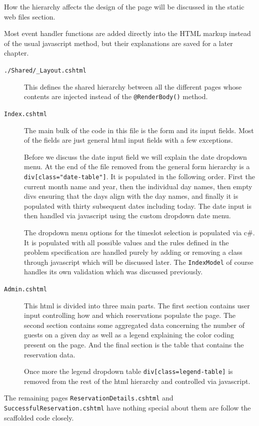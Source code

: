 \documentclass[12pt, a4paper]{article}
\begin{document}
How the hierarchy affects the design of the page will be discussed in the static web files section. 

Most event handler functions are added directly into the HTML markup instead of the usual javascript method, but their explanations are saved for a later chapter.
\begin{description}
    \item[\texttt{./Shared/\_Layout.cshtml}] This defines the shared hierarchy between all the different pages whose contents are injected instead of the \texttt{@RenderBody()} method. 
    \item[\texttt{Index.cshtml}] The main bulk of the code in this file is the form and its input fields. Most of the fields are just general html input fields with a few exceptions.
    
    Before we discuss the date input field we will explain the date dropdown menu.
    At the end of the file removed from the general form hierarchy is a \texttt{div[class="date-table"]}. It is populated in the following order. First the current month name and year, then the individual day names, then empty divs ensuring that the days align with the day names, and finally it is populated with thirty subsequent dates including today.
    The date input is then handled via javascript using the custom dropdown date menu.

    The dropdown menu options for the timeslot selection is populated via c\#. It is populated with all possible values and the rules defined in the problem specification are handled purely by adding or removing a class through javascript which will be discussed later. The \texttt{IndexModel} of course handles its own validation which was discussed previously.
    \item[\texttt{Admin.cshtml}] This html is divided into three main parts. The first section contains user input controlling how and which reservations populate the page. The second section contains some aggregated data concerning the number of guests on a given day as well as a legend explaining the color coding present on the page. And the final section is the table that contains the reservation data. 
    
    Once more the legend dropdown table \texttt{div[class=legend-table]} is removed from the rest of the html hierarchy and controlled via javascript.

\end{description}
The remaining pages \texttt{ReservationDetails.cshtml} and \texttt{SuccessfulReservation.cshtml} have nothing special about them are follow the scaffolded code closely.
\end{document}
